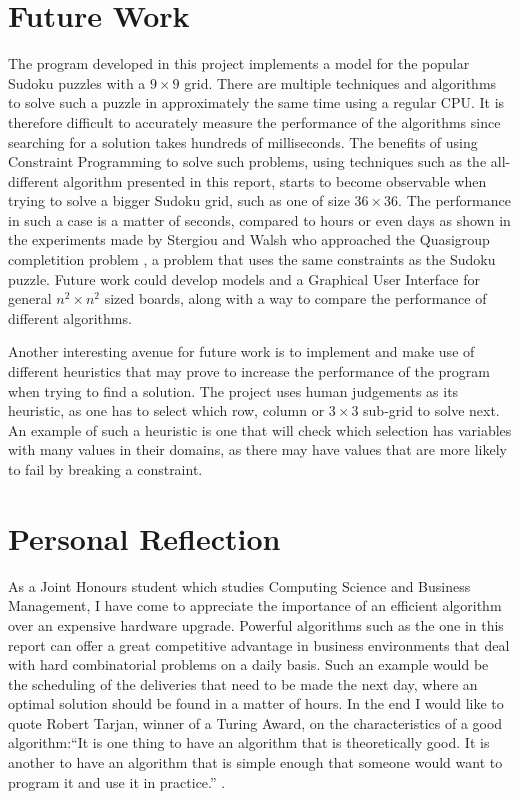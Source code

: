 \documentclass{l4proj}
\begin{document}
\section{Future Work}
\noindent The program developed in this project implements a model for the popular Sudoku puzzles with a $9 \times 9$ grid. There are multiple techniques and algorithms to solve such a puzzle in approximately the same time using a regular CPU. It is therefore difficult to accurately measure the performance of the algorithms since searching for a solution takes hundreds of milliseconds. The benefits of using Constraint Programming to solve such problems, using techniques such as the all-different algorithm presented in this report, starts to become observable when trying to solve a bigger Sudoku grid, such as one of size $36 \times 36$. The performance in such a case is a matter of seconds, compared to hours or even days as shown in the experiments made by Stergiou and Walsh \cite{stergiou1999difference} who approached the Quasigroup completition problem \cite{gomes2002completing}, a problem that uses the same constraints as the Sudoku puzzle. Future work could develop models and a Graphical User Interface for general $n^2\times n^2$ sized boards, along with a way to compare the performance of different algorithms.

\noindent Another interesting avenue for future work is to implement and make use of different heuristics that may prove to increase the performance of the program when trying to find a solution. The project uses human judgements as its heuristic, as one has to select which row, column or $3 \times 3$ sub-grid to solve next. An example of such a heuristic is one that will check which selection has variables with many values in their domains, as there may have values that are more likely to fail by breaking a constraint.

\section{Personal Reflection}
As a Joint Honours student which studies Computing Science and Business Management, I have come to appreciate the importance of an efficient algorithm over an expensive hardware upgrade. Powerful algorithms such as the one in this report can offer a great competitive advantage in business environments that deal with hard combinatorial problems on a daily basis. Such an example would be the scheduling of the deliveries that need to be made the next day, where an optimal solution should be found in a matter of hours. In the end I would like to quote Robert Tarjan, winner of a Turing Award, on the characteristics of a good algorithm:``It is one thing to have an algorithm that is theoretically good. It is another to have an algorithm that is simple enough that someone would want to program it and use it in practice.'' \cite{tarjanart}.
\end{document}
